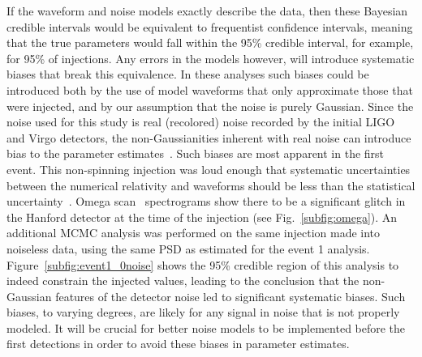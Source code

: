 If the waveform and noise models exactly describe the data, then these Bayesian
credible intervals would be equivalent to frequentist confidence intervals,
meaning that the true parameters would fall within the 95\% credible interval,
for example, for 95\% of injections.  Any errors in the models however,
will introduce systematic biases that break this equivalence.  In these
analyses such biases could be introduced both by the use of model waveforms
that only approximate those that were injected, and by our assumption that the
noise is purely Gaussian.  Since the noise used for this study is real
(recolored) noise recorded by the initial LIGO and Virgo detectors, the
non-Gaussianities inherent with real noise can introduce bias to the parameter
estimates~\cite{Aasi:2013jjl}.  Such biases are most apparent in the first
event.  This non-spinning injection was loud enough that systematic
uncertainties between the numerical relativity and \eob waveforms should be
less than the statistical uncertainty~\cite{Littenberg:2012uj}.  Omega
scan~\cite{Isogai:2010zz} spectrograms show there to be a significant glitch in
the Hanford detector at the time of the injection (see
Fig.~\ref{subfig:omega}).  An additional MCMC analysis was performed on the same
injection made into noiseless data, using the same PSD as estimated for the
event 1 analysis.  Figure~\ref{subfig:event1_0noise} shows the 95\% credible
region of this analysis to indeed constrain the injected values, leading to the
conclusion that the non-Gaussian features of the detector noise led to
significant systematic biases.  Such biases, to varying degrees, are likely for
any signal in noise that is not properly modeled.  It will be crucial for
better noise models to be implemented before the first detections in order to
avoid these biases in parameter estimates.

